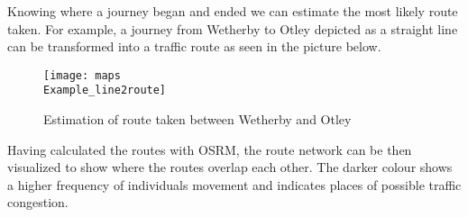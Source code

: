 \documentclass[]{article}
\begin{document}
Knowing where a journey began and ended we can estimate the most likely
route taken. For example, a journey from Wetherby to Otley depicted as a
straight line can be transformed into a traffic route as seen in the
picture below.

\begin{figure}
\texttt{[image: maps\\Example\_line2route]} \caption{Estimation of route taken between Wetherby and Otley}\label{fig:pressure}
\end{figure}

Having calculated the routes with OSRM, the route network can be then
visualized to show where the routes overlap each other. The darker
colour shows a higher frequency of individuals movement and indicates
places of possible traffic congestion.
\end{document}
